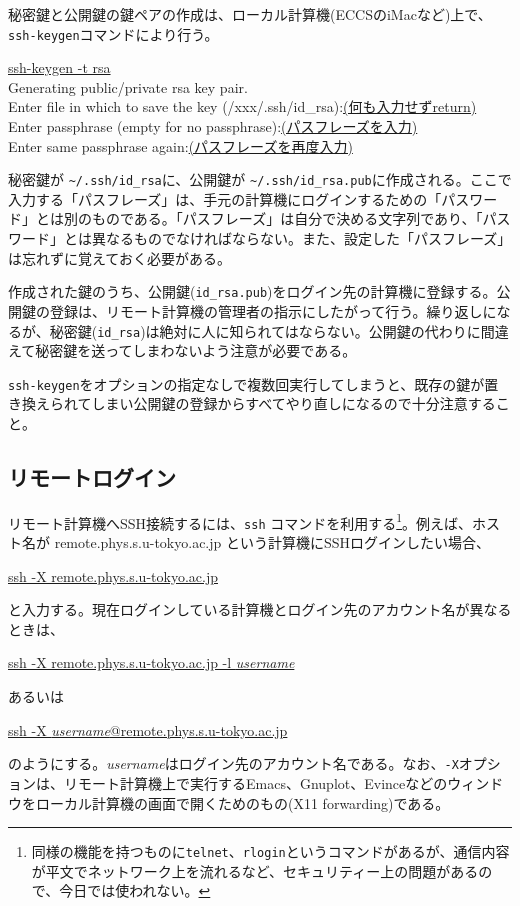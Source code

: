 秘密鍵と公開鍵の鍵ペアの作成は、ローカル計算機(ECCSのiMacなど)上で、\texttt{ssh-keygen}コマンドにより行う。
\begin{commandline2}
    \prompt \underline{ssh-keygen -t rsa} \\
    Generating public/private rsa key pair.\\
    Enter file in which to save the key (/xxx/.ssh/id\_rsa):\underline{(何も入力せずreturn)}\\
    Enter passphrase (empty for no passphrase):\underline{(パスフレーズを入力)}\\
    Enter same passphrase again:\underline{(パスフレーズを再度入力)}
\end{commandline2} \noindent
秘密鍵が \texttt{\~{}/.ssh/id\_rsa}に、公開鍵が \texttt{\~{}/.ssh/id\_rsa.pub}に作成される。ここで入力する「パスフレーズ」は、手元の計算機にログインするための「パスワード」とは別のものである。「パスフレーズ」は自分で決める文字列であり、「パスワード」とは異なるものでなければならない。また、設定した「パスフレーズ」は忘れずに覚えておく必要がある。

作成された鍵のうち、公開鍵(\texttt{id\_rsa.pub})をログイン先の計算機に登録する。公開鍵の登録は、リモート計算機の管理者の指示にしたがって行う。繰り返しになるが、秘密鍵(\texttt{id\_rsa})は絶対に人に知られてはならない。公開鍵の代わりに間違えて秘密鍵を送ってしまわないよう注意が必要である。

\texttt{ssh-keygen}をオプションの指定なしで複数回実行してしまうと、既存の鍵が置き換えられてしまい公開鍵の登録からすべてやり直しになるので十分注意すること。
\subsection{リモートログイン}

リモート計算機へSSH接続するには、\texttt{ssh} コマンドを利用する\footnote{同様の機能を持つものに\texttt{telnet}、\texttt{rlogin}というコマンドがあるが、通信内容が平文でネットワーク上を流れるなど、セキュリティー上の問題があるので、今日では使われない。}。例えば、ホスト名が remote.phys.s.u-tokyo.ac.jp という計算機にSSHログインしたい場合、
\begin{commandline2}
    \prompt \underline{ssh -X remote.phys.s.u-tokyo.ac.jp}
\end{commandline2} \noindent
と入力する。現在ログインしている計算機とログイン先のアカウント名が異なるときは、
\begin{commandline2}
    \prompt \underline{ssh -X remote.phys.s.u-tokyo.ac.jp -l \textit{username}}
\end{commandline2} \noindent
あるいは
\begin{commandline2}
    \prompt \underline{ssh -X \textit{username}@remote.phys.s.u-tokyo.ac.jp}
\end{commandline2} \noindent
のようにする。\textit{username}はログイン先のアカウント名である。なお、\texttt{-X}オプションは、リモート計算機上で実行するEmacs、Gnuplot、Evinceなどのウィンドウをローカル計算機の画面で開くためのもの(X11 forwarding)である。

